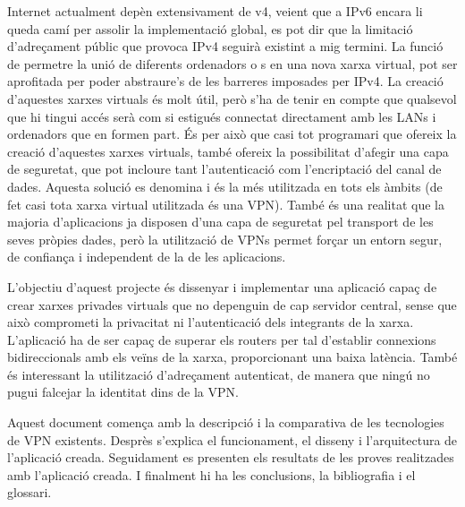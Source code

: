 Internet actualment depèn extensivament de v4, veient que a IPv6 encara li queda camí per assolir la implementació global, es pot dir que la limitació d'adreçament públic que provoca IPv4 seguirà existint a mig termini. La funció de permetre la unió de diferents ordenadors o s en una nova xarxa virtual, pot ser aprofitada per poder abstraure's de les barreres imposades per IPv4. La creació d'aquestes xarxes virtuals és molt útil, però s'ha de tenir en compte que qualsevol que hi tingui accés serà com si estigués connectat directament amb les LANs i ordenadors que en formen part. És per això que casi tot programari que ofereix la creació d'aquestes xarxes virtuals, també ofereix la possibilitat d'afegir una capa de seguretat, que pot incloure tant l'autenticació com l'encriptació del canal de dades. Aquesta solució es denomina  i és la més utilitzada en tots els àmbits (de fet casi tota xarxa virtual utilitzada és una VPN).
També és una realitat que la majoria d'aplicacions ja disposen d'una capa de seguretat pel transport de les seves pròpies dades, però la utilització de VPNs permet forçar un entorn segur, de confiança i independent de la de les aplicacions. 

L'objectiu d'aquest projecte és dissenyar i implementar una aplicació capaç de crear xarxes privades virtuals que no depenguin de cap servidor central, sense que això comprometi la privacitat ni l'autenticació dels integrants de la xarxa. L'aplicació ha de ser capaç de superar els routers  per tal d'establir connexions bidireccionals amb els veïns de la xarxa, proporcionant una baixa latència. També és interessant la utilització d'adreçament autenticat, de manera que ningú no pugui falcejar la identitat dins de la VPN.

Aquest document comença amb la descripció i la comparativa de les tecnologies de VPN existents.
Desprès s'explica el funcionament, el disseny i l'arquitectura de l'aplicació creada.
Seguidament es presenten els resultats de les proves realitzades amb l'aplicació creada. 
I finalment hi ha les conclusions, la bibliografia i el glossari.
